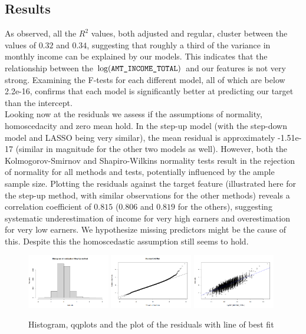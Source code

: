 \documentclass[hidelinks,12pt]{article}
\begin{document}
\subsection{Results}
As observed, all the $R^2$ values, both adjusted and regular, cluster between the values of $0.32$ and $0.34$, suggesting that roughly a third of the variance in monthly income can be explained by our models. This indicates that the relationship between the $\log(\verb|AMT_INCOME_TOTAL|)$ and our features is not very strong. Examining the F-tests for each different model, all of which are below 2.2e-16, confirms that each model is significantly better at predicting our target than the intercept.\\ 
Looking now at the residuals we assess if the assumptions of normality, homoscedacity and zero mean hold. In the step-up model (with the step-down model and LASSO being very similar), the mean residual is approximately -1.51e-17 (similar in magnitude for the other two models as well). However, both the Kolmogorov-Smirnov and Shapiro-Wilkins normality tests result in the rejection of normality for all methods and tests, potentially influenced by the ample sample size. Plotting the residuals against the target feature (illustrated here for the step-up method, with similar observations for the other methods) reveals a correlation coefficient of $0.815$ ($0.806$ and $0.819$ for the others), suggesting systematic underestimation of income for very high earners and overestimation for very low earners. We hypothesize missing predictors might be the cause of this. Despite this the homoscedastic assumption still seems to hold. 
\begin{figure}[h]
  \begin{center}
  \includegraphics[width=0.32\textwidth]{img/20da428d-0af1-4f49-a7aa-66b7a1fe13bc.png}
  \includegraphics[width=0.32\textwidth]{img/6f01eecb-4039-4daa-ba0c-af7263bd658c.png}
  \includegraphics[width=0.32\textwidth]{img/b94b8a81-3824-47f5-a158-d8e9560e6ce2.png}
\end{center}
\caption{Histogram, qqplots and the plot of the residuals with line of best fit}
\end{figure}\\
\end{document}
